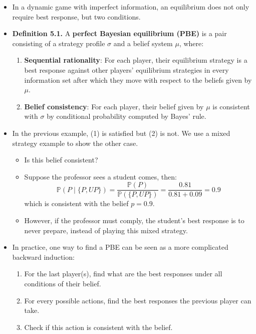 \documentclass[notitlepage]{article}
\begin{document}
\begin{itemize}
    \item In a dynamic game with imperfect information, an equilibrium does not only require best response, but two conditions.
    \item \textbf{Definition 5.1.} A \textbf{perfect Bayesian equilibrium (PBE)} is a pair consisting of a strategy profile \(\sigma\) and a belief system \(\mu\), where:
    \begin{enumerate}
        \item \textbf{Sequential rationality}: For each player, their equilibrium strategy is a best response against other players' equilibrium strategies in every information set after which they move with respect to the beliefs given by \(\mu\).
        \item \textbf{Belief consistency}: For each player, their belief given by \(\mu\) is consistent with \(\sigma\) by conditional probability computed by Bayes' rule.
    \end{enumerate}

    \item In the previous example, (1) is satisfied but (2) is not. We use a mixed strategy example to show the other case.

    \begin{figure}[h]
        \centering
        \resizebox{0.3\textwidth}{!}{
        
        }
    \end{figure}
    \begin{itemize}
        \item Is this belief consistent?
        \item Suppose the professor sees a student comes, then:
        \[
        \mathbb{P}(P \mid \{P, UP\}) = \frac{\mathbb{P}(P)}{\mathbb{P}(\{P, UP\})} = \frac{0.81}{0.81+0.09} = 0.9
        \]
        which is consistent with the belief \(p=0.9\).
        \item However, if the professor must comply, the student's best response is to never prepare, instead of playing this mixed strategy.
    \end{itemize}

    \item In practice, one way to find a PBE can be seen as a more complicated backward induction:
    \begin{enumerate}
        \item For the last player(s), find what are the best responses under all conditions of their belief.
        \item For every possible actions, find the best responses the previous player can take.
        \item Check if this action is consistent with the belief.
    \end{enumerate}


\end{itemize}
\end{document}
